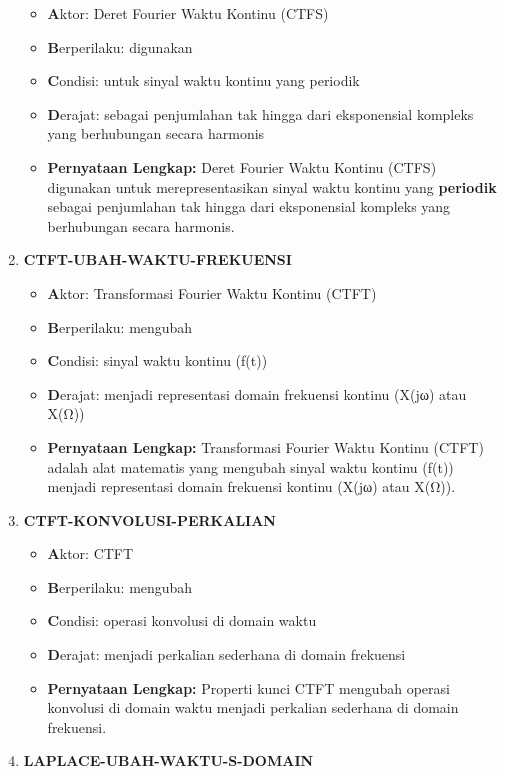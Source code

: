 \documentclass[
  letterpaper,
  DIV=11,
  numbers=noendperiod]{scrreprt}
\begin{document}
\begin{enumerate}
  \begin{itemize}
  \item
    \textbf{A}ktor: Deret Fourier Waktu Kontinu (CTFS)
  \item
    \textbf{B}erperilaku: digunakan
  \item
    \textbf{C}ondisi: untuk sinyal waktu kontinu yang periodik
  \item
    \textbf{D}erajat: sebagai penjumlahan tak hingga dari eksponensial
    kompleks yang berhubungan secara harmonis
  \item
    \textbf{Pernyataan Lengkap:} Deret Fourier Waktu Kontinu (CTFS)
    digunakan untuk merepresentasikan sinyal waktu kontinu yang
    \textbf{periodik} sebagai penjumlahan tak hingga dari eksponensial
    kompleks yang berhubungan secara harmonis.
  \end{itemize}
\item
  \textbf{CTFT-UBAH-WAKTU-FREKUENSI}

  \begin{itemize}
  \item
    \textbf{A}ktor: Transformasi Fourier Waktu Kontinu (CTFT)
  \item
    \textbf{B}erperilaku: mengubah
  \item
    \textbf{C}ondisi: sinyal waktu kontinu (f(t))
  \item
    \textbf{D}erajat: menjadi representasi domain frekuensi kontinu
    (X(jω) atau X(Ω))
  \item
    \textbf{Pernyataan Lengkap:} Transformasi Fourier Waktu Kontinu
    (CTFT) adalah alat matematis yang mengubah sinyal waktu kontinu
    (f(t)) menjadi representasi domain frekuensi kontinu (X(jω) atau
    X(Ω)).
  \end{itemize}
\item
  \textbf{CTFT-KONVOLUSI-PERKALIAN}

  \begin{itemize}
  \item
    \textbf{A}ktor: CTFT
  \item
    \textbf{B}erperilaku: mengubah
  \item
    \textbf{C}ondisi: operasi konvolusi di domain waktu
  \item
    \textbf{D}erajat: menjadi perkalian sederhana di domain frekuensi
  \item
    \textbf{Pernyataan Lengkap:} Properti kunci CTFT mengubah operasi
    konvolusi di domain waktu menjadi perkalian sederhana di domain
    frekuensi.
  \end{itemize}
\item
  \textbf{LAPLACE-UBAH-WAKTU-S-DOMAIN}


\end{enumerate}
\end{document}
